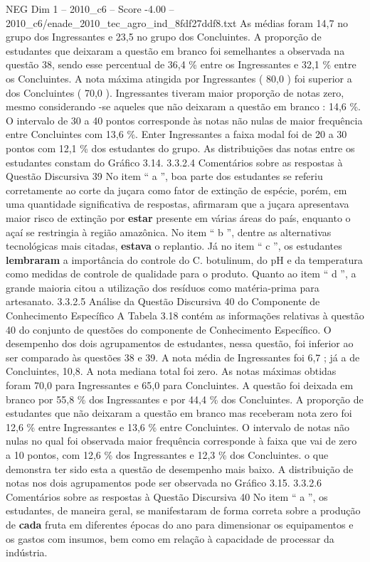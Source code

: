 \begin{textsample}{NEG Dim 1 – 2010\_c6 – Score -4.00 – 2010\_c6/enade\_2010\_tec\_agro\_ind\_8fdf27ddf8.txt}
As médias foram 14,7 no grupo dos Ingressantes e 23,5 no grupo dos Concluintes.
A proporção de estudantes que deixaram a questão em branco foi semelhantes a observada na questão 38, sendo esse percentual de 36,4 \% entre os Ingressantes e 32,1 \% entre os Concluintes.
A nota máxima atingida por Ingressantes ( 80,0 ) foi superior a dos Concluintes ( 70,0 ).
Ingressantes tiveram maior proporção de notas zero, mesmo considerando -se aqueles que não deixaram a questão em branco : 14,6 \%.
O intervalo de 30 a 40 pontos corresponde às notas não nulas de maior frequência entre Concluintes com 13,6 \%.
Enter Ingressantes a faixa modal foi de 20 a 30 pontos com 12,1 \% dos estudantes do grupo.
As distribuições das notas entre os estudantes constam do Gráfico 3.14. 3.3.2.4 Comentários sobre as respostas à Questão Discursiva 39 No item “ a ”, boa parte dos estudantes se referiu corretamente ao corte da juçara como fator de extinção de espécie, porém, em uma quantidade significativa de respostas, afirmaram que a juçara apresentava maior risco de extinção por \textbf{estar} presente em várias áreas do país, enquanto o açaí se restringia à região amazônica.
No item “ b ”, dentre as alternativas tecnológicas mais citadas, \textbf{estava} o replantio.
Já no item “ c ”, os estudantes \textbf{lembraram} a importância do controle do C. botulinum, do pH e da temperatura como medidas de controle de qualidade para o produto.
Quanto ao item “ d ”, a grande maioria citou a utilização dos resíduos como matéria-prima para artesanato. 3.3.2.5 Análise da Questão Discursiva 40 do Componente de Conhecimento Específico A Tabela 3.18 contém as informações relativas à questão 40 do conjunto de questões do componente de Conhecimento Específico.
O desempenho dos dois agrupamentos de estudantes, nessa questão, foi inferior ao ser comparado às questões 38 e 39.
A nota média de Ingressantes foi 6,7 ; já a de Concluintes, 10,8.
A nota mediana total foi zero.
As notas máximas obtidas foram 70,0 para Ingressantes e 65,0 para Concluintes.
A questão foi deixada em branco por 55,8 \% dos Ingressantes e por 44,4 \% dos Concluintes.
A proporção de estudantes que não deixaram a questão em branco mas receberam nota zero foi 12,6 \% entre Ingressantes e 13,6 \% entre Concluintes.
O intervalo de notas não nulas no qual foi observada maior frequência corresponde à faixa que vai de zero a 10 pontos, com 12,6 \% dos Ingressantes e 12,3 \% dos Concluintes. o que demonstra ter sido esta a questão de desempenho mais baixo.
A distribuição de notas nos dois agrupamentos pode ser observada no Gráfico 3.15. 3.3.2.6 Comentários sobre as respostas à Questão Discursiva 40 No item “ a ”, os estudantes, de maneira geral, se manifestaram de forma correta sobre a produção de \textbf{cada} fruta em diferentes épocas do ano para dimensionar os equipamentos e os gastos com insumos, bem como em relação à capacidade de processar da indústria.

\end{textsample}
